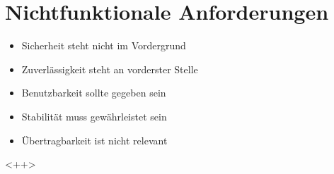 
\chapter{Nichtfunktionale Anforderungen}

\begin{itemize}
	\item Sicherheit steht nicht im Vordergrund
	\item Zuverlässigkeit steht an vorderster Stelle
	\item Benutzbarkeit sollte gegeben sein
	\item Stabilität muss gewährleistet sein
	\item Übertragbarkeit ist nicht relevant
\end{itemize}<++>

